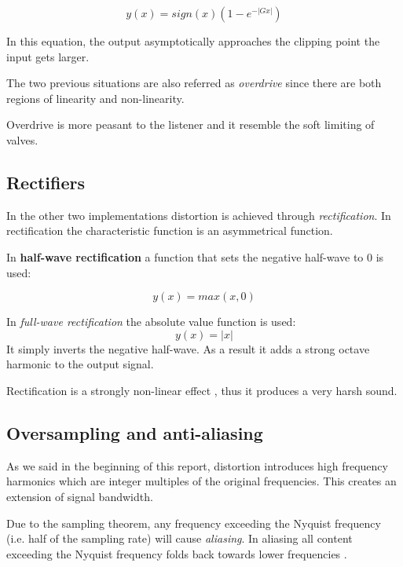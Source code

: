 \documentclass[letterpaper, 12pt]{article}
\begin{document}
	\begin{equation}
		y(x) = sign(x) ( 1 - e^{-|Gx|} )
	\end{equation}
	
	In this equation, the output asymptotically approaches the clipping point the input gets larger.
	
	The two previous situations are also referred as \textit{overdrive} since there are both regions of linearity and non-linearity.
	
	Overdrive is more peasant to the listener and it resemble the soft limiting of valves.
	
	
	\subsection*{Rectifiers}
	In the other two implementations distortion is achieved through \textit{rectification}. In rectification the characteristic function is an asymmetrical function.
	
	In \textbf{half-wave rectification} a function that sets the negative half-wave to 0 is used:
	
	\begin{equation}
		y(x) = max(x,0)
	\end{equation}
	
	In \textit{full-wave rectification} the absolute value function is used:
	\begin{equation}
		y(x) = |x|
	\end{equation}
	It simply inverts the negative half-wave. As a result it adds a  strong octave harmonic to the output signal.
	
	Rectification is a strongly non-linear effect , thus it produces a very harsh sound. 
	
	\subsection*{Oversampling and anti-aliasing}
	
	As we said in the beginning of this report, distortion introduces high frequency harmonics which are integer multiples of the original frequencies. This creates an extension of signal bandwidth. 
	
	Due to the sampling theorem, any frequency exceeding the Nyquist frequency (i.e. half of the sampling rate) will cause \textit{aliasing}. In aliasing all content exceeding the Nyquist frequency folds back towards lower frequencies \cite{oversampling}.
	
\end{document}
